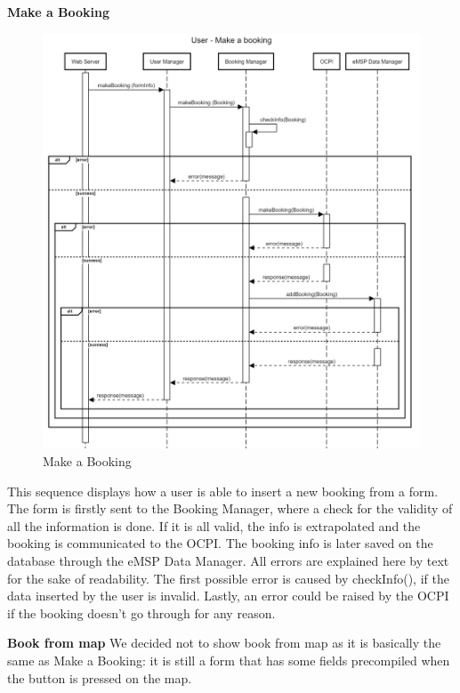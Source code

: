 \documentclass[table, 12pt]{article}
\begin{document}
\newpage
\textbf{Make a Booking}
 \begin{center}
    \begin{figure}[H]
        \includegraphics[scale=0.15, center]{assets/sequenceDiagrams/User Make Booking.png}
        \caption{Make a Booking}
        \label{Make Booking}
    \end{figure}
\end{center}
This sequence displays how a user is able to insert a new booking from a form. The form is firstly sent to the Booking Manager, where a check for the validity of all the information is done. If it is all valid, the info is extrapolated and the 
booking is communicated to the OCPI. The booking info is later saved on the database through the eMSP Data Manager. All errors are explained here by text for the sake of readability.
The first possible error is caused by checkInfo(), if the data inserted by the user is invalid. Lastly, an error could be raised by the OCPI if the booking doesn't go through for any reason.
\newline

\textbf{Book from map}\newline
We decided not to show book from map as it is basically the same as Make a Booking: it is still a form that has some fields precompiled when the button is pressed on the map.
\end{document}
